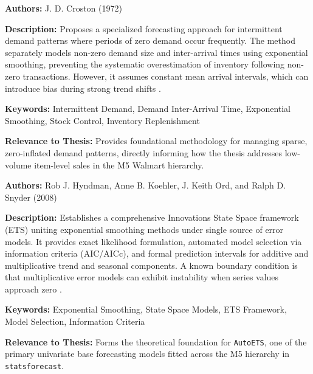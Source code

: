 {

	\textbf{Authors:}
	J. D. Croston (1972)

	\textbf{Description:}
	Proposes a specialized forecasting approach for intermittent demand patterns where periods of zero demand occur frequently. The method separately models non-zero demand size and inter-arrival times using exponential smoothing, preventing the systematic overestimation of inventory following non-zero transactions. However, it assumes constant mean arrival intervals, which can introduce bias during strong trend shifts \autocite{Croston:1972}.

	\textbf{Keywords:}
	Intermittent Demand, Demand Inter-Arrival Time, Exponential Smoothing, Stock Control, Inventory Replenishment

	\textbf{Relevance to Thesis:}
	Provides foundational methodology for managing sparse, zero-inflated demand patterns, directly informing how the thesis addresses low-volume item-level sales in the M5 Walmart hierarchy.

}

{

	\textbf{Authors:}
	Rob J. Hyndman, Anne B. Koehler, J. Keith Ord, and Ralph D. Snyder (2008)

	\textbf{Description:}
	Establishes a comprehensive Innovations State Space framework (ETS) uniting exponential smoothing methods under single source of error models. It provides exact likelihood formulation, automated model selection via information criteria (AIC/AICc), and formal prediction intervals for additive and multiplicative trend and seasonal components. A known boundary condition is that multiplicative error models can exhibit instability when series values approach zero \autocite{Hyndman:2008}.

	\textbf{Keywords:}
	Exponential Smoothing, State Space Models, ETS Framework, Model Selection, Information Criteria

	\textbf{Relevance to Thesis:}
	Forms the theoretical foundation for \texttt{AutoETS}, one of the primary univariate base forecasting models fitted across the M5 hierarchy in \texttt{statsforecast}.

}


